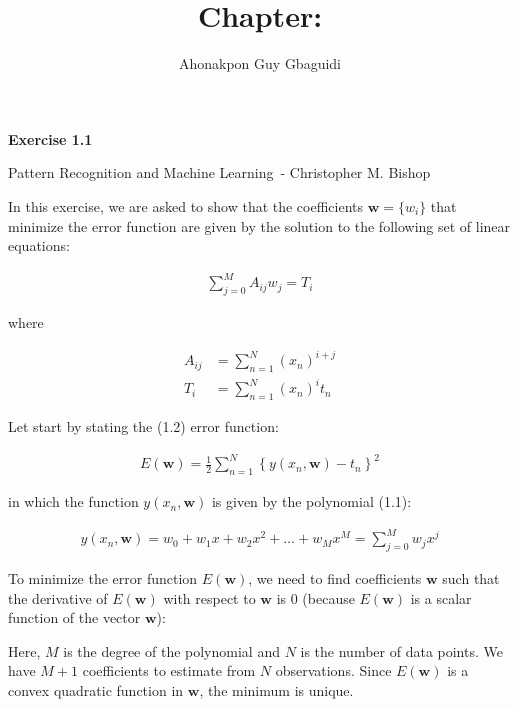 \documentclass{article}
\title{Chapter: \ChapterName}
\author{Ahonakpon Guy Gbaguidi}
\date{}
\newcommand{\BookName}{Pattern Recognition and Machine Learning}
\newcommand{\BookAuthor}{Christopher M. Bishop}
\newcommand{\ExerciseID}{1.1}
\begin{document}
\maketitle

\begin{center}
  \large\textbf{Exercise \ExerciseID}

  \vspace{0.5em}

  \normalsize\BookName\ - \BookAuthor
\end{center}

\begin{tcolorbox}[breakable,colback=gray!5,colframe=gray!60,title=Solution]
In this exercise, we are asked to show that the coefficients  
$\textbf{w} = \{w_i\}$ that minimize the error function are given by the solution to the following set of linear equations:

\begin{align*}
  \sum_{j=0}^M A_{ij} w_j = T_i
\end{align*}

where

\begin{align*}
  A_{ij} &= \sum_{n=1}^N \left( x_n \right)^{i+j} \\
  T_i &= \sum_{n=1}^N \left( x_n \right)^i t_n
\end{align*}   

Let start by stating the (1.2) error function:

\begin{align*}
  E(\textbf{w}) = \frac{1}{2} \sum_{n=1}^N \left\{ y(x_n, \textbf{w}) - t_n \right\}^2
\end{align*}

in which the function $y(x_n,  \textbf{w})$ is given by the polynomial (1.1):

\begin{align*}
  y(x_n, \textbf{w}) = w_0 + w_1 x + w_2 x^2 + \ldots + w_M x^M = \sum_{j=0}^M w_j x^j
\end{align*}

To minimize the error function $E(\textbf{w})$, we need to find coefficients $\textbf{w}$ such that the derivative of $E(\textbf{w})$ with respect to $\textbf{w}$ is 0 (because $E(\textbf{w})$ is a scalar function of the vector $\textbf{w}$):

Here, $M$ is the degree of the polynomial and $N$ is the number of data points. We have $M+1$ coefficients to estimate from $N$ observations. Since $E(\textbf{w})$ is a convex quadratic function in $\textbf{w}$, the minimum is unique.


\end{tcolorbox}
\end{document}
